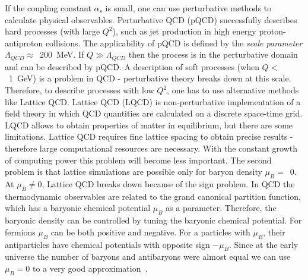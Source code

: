       If the coupling constant $\alpha_s$ is small, one can use perturbative methods to calculate physical observables.
      Perturbative QCD (pQCD) successfully describes hard processes (with large $Q^2$), such as jet production in high energy proton-antiproton collisions.
      The applicability of pQCD is defined by the \textit{scale parameter} $\Lambda_{QCD} \approx$~200~MeV.
      If $Q \gg \Lambda_{QCD}$ then the process is in the perturbative domain and can be described by pQCD.
      A description of soft processes (when $Q <$~1~GeV) is a problem in QCD - perturbative theory breaks down at this scale.
      Therefore, to describe processes with low $Q^2$, one has to use alternative methods like Lattice QCD.
      Lattice QCD (LQCD) is non-perturbative implementation of a field theory in which QCD quantities are calculated on a discrete space-time grid.
      LQCD allows to obtain properties of matter in equilibrium, but there are some limitations.
      Lattice QCD requires fine lattice spacing to obtain precise results - therefore large computational resources are necessary.
      With the constant growth of computing power this problem will become less important.
      The second problem is that lattice simulations are possible only for baryon density $\mu_B = $~0.
      At $\mu_B \neq 0$, Lattice QCD breaks down because of the sign problem.
      In QCD the thermodynamic observables are related to the grand canonical partition function, which has a baryonic chemical potential $\mu_B$ as a parameter.
      Therefore, the baryonic density can be controlled by tuning the baryonic chemical potential.
      For fermions $\mu_B$ can be both positive and negative.
      For a particles with $\mu_B$, their antiparticles have chemical potentials with opposite sign $-\mu_B$.
      Since at the early universe the number of baryons and antibaryons were almost equal we can use $\mu_B=0$ to a very good approximation~\cite{qcd_fodor}.
